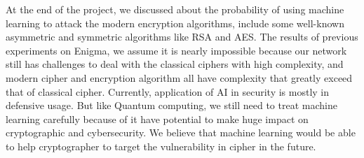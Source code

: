 At the end of the project, we discussed about the probability of using machine learning to attack the modern encryption algorithms, include some well-known asymmetric and symmetric algorithms like RSA and AES. The results of previous experiments on Enigma, we assume it is nearly impossible because our network still has challenges to deal with the classical ciphers with high complexity, and modern cipher and encryption algorithm all have complexity that greatly exceed that of classical cipher. Currently, application of AI in security is mostly in defensive usage. But like Quantum computing, we still need to treat machine learning carefully because of it have potential to make huge impact on cryptographic and cybersecurity. We believe that machine learning would be able to help cryptographer to target the vulnerability in cipher in the future.
